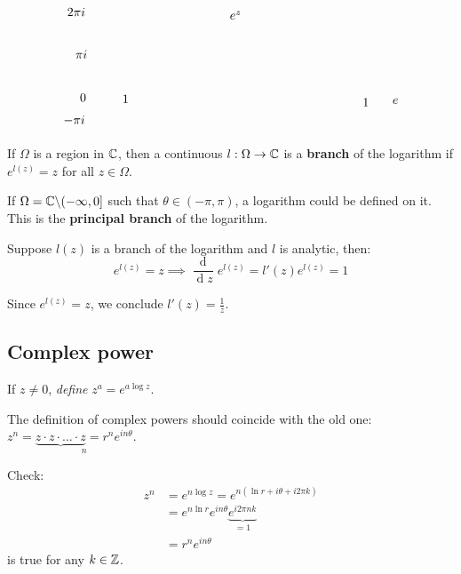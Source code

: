 \documentclass[12pt]{article}
\renewcommand{\d}{\ensuremath{\operatorname{d}}}
\begin{document}
\[\begin{tikzpicture}[x=0.75pt,y=0.75pt,yscale=-1,xscale=1]
    \draw (102,132.4) node [anchor=north west][inner sep=0.75pt]    {$0$};
    \draw (147.63,133.79) node [anchor=north west][inner sep=0.75pt]    {$1$};
    \draw (88.4,40) node [anchor=north west][inner sep=0.75pt]    {$2\pi i$};
    \draw (97.2,85.6) node [anchor=north west][inner sep=0.75pt]    {$\pi i$};
    \draw (84.4,156) node [anchor=north west][inner sep=0.75pt]    {$-\pi i$};
    \draw (262.8,43.4) node [anchor=north west][inner sep=0.75pt]    {$e^{z}$};
    \draw (405.35,137.46) node [anchor=north west][inner sep=0.75pt]    {$1$};
    \draw (437.35,137.46) node [anchor=north west][inner sep=0.75pt]    {$e$};
    
    
    \end{tikzpicture}
    \]

 If $\Omega$ is a region in $\mathbb{C}$, then a continuous $l:\Omega \to \mathbb{C}$ is a \textbf{branch} of the logarithm if $e^{l(z)}=z$ for all $z\in \Omega$.

\eg If $\Omega=\mathbb{C}\backslash(-\infty, 0]$ such that $\theta\in (-\pi,\pi)$, a logarithm could be defined on it. This is the \textbf{principal branch} of the logarithm.

\rmk Suppose $l(z)$ is a branch of the logarithm and $l$ is analytic, then: \[e^{l(z)}=z\implies \frac{\d}{\d z}e^{l(z)} = l'(z)e^{l(z)}=1\]

Since $e^{l(z)}=z$, we conclude $l'(z)=\frac{1}{z}$.

\subsection{Complex power}
 If $z\neq 0$, \textit{define} $z^{a}=e^{a\log z}$.

\rmk The definition of complex powers should coincide with the old one: $z^n=\underset{n}{\underbrace{z\cdot z\cdot\dots\cdot z}=r^ne^{in\theta}}$.

Check: \begin{align*}
    z^n&=e^{n\log z}=e^{n(\ln r+i\theta+i2\pi k)}\\
    &= e^{n\ln r}e^{in\theta}\underset{=1}{\underbrace{e^{i2\pi nk}}}\\
    &= r^ne^{in\theta}
\end{align*} is true for any $k\in \mathbb{Z}$.
\end{document}
